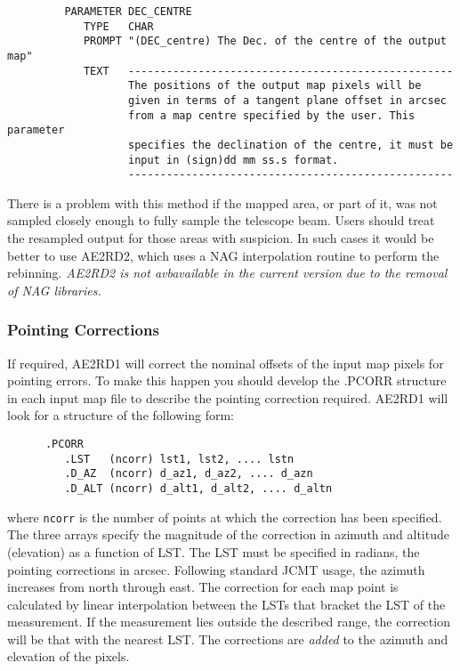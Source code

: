 \documentclass[twoside,11pt]{article}
\renewcommand{\_}{\texttt{\symbol{95}}}
\begin{document}
\begin{small}
\begin{verbatim}
         PARAMETER DEC_CENTRE
            TYPE   CHAR
            PROMPT "(DEC_centre) The Dec. of the centre of the output map"
            TEXT   ---------------------------------------------------
                   The positions of the output map pixels will be 
                   given in terms of a tangent plane offset in arcsec 
                   from a map centre specified by the user. This parameter
                   specifies the declination of the centre, it must be 
                   input in (sign)dd mm ss.s format.
                   ---------------------------------------------------
\end{verbatim}
\end{small}

\goodbreak

There is a problem with this method if the mapped area, or part of it,
was not sampled closely enough to fully sample the telescope beam.
Users should treat the resampled output for those  areas with
suspicion. In such cases it would be better to use AE2RD2, which uses
a NAG interpolation routine to perform the rebinning. \textit{AE2RD2 is not
  avbavailable in the current version due to the removal of NAG libraries.}


\goodbreak

\subsubsection {Pointing Corrections}

If required, AE2RD1 will correct the nominal offsets of the  input map
pixels for pointing errors. To make this happen you should develop
the .PCORR structure in each input map file to describe the pointing
correction required. AE2RD1 will look for a structure of the following form:

\begin{small}
\begin{verbatim}
      .PCORR
         .LST   (ncorr) lst1, lst2, .... lstn
         .D_AZ  (ncorr) d_az1, d_az2, .... d_azn
         .D_ALT (ncorr) d_alt1, d_alt2, .... d_altn
\end{verbatim}
\end{small}

where \verb+ncorr+ is the number of points at which the correction has
been specified. The three arrays specify the magnitude of the correction
in azimuth and altitude (elevation) as a function of LST. The LST must be
specified in radians, the pointing corrections in arcsec. Following standard
JCMT usage, the azimuth increases from north through east. The
correction for each map point is calculated by linear interpolation
between the LSTs that bracket the LST of the measurement. If the
measurement lies outside the described  range, the correction will be
that with the nearest LST. The corrections are {\em added} to the azimuth
and elevation of the pixels.
\end{document}

